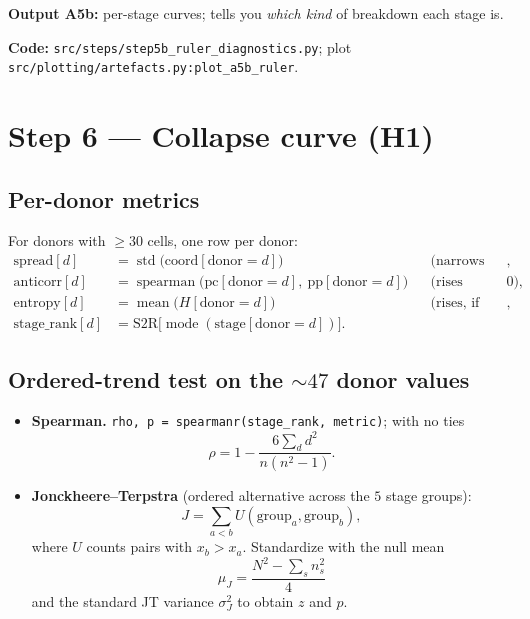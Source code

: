 \documentclass[11pt]{article}
\newcommand{\code}[1]{\texttt{\small #1}}
\newcommand{\coordc}{\mathrm{coord}}
\begin{document}
\textbf{Output A5b:} per-stage curves; tells you \emph{which kind} of breakdown each stage is.

\medskip
\noindent\textbf{Code:} \code{src/steps/step5b\_ruler\_diagnostics.py};
plot \code{src/plotting/artefacts.py:plot\_a5b\_ruler}.

\section{Step 6 --- Collapse curve (H1)}

\subsection{Per-donor metrics}
For donors with $\ge 30$ cells, one row per donor:
\begin{align}
  \text{spread}[d]     &= \operatorname{std}\big(\coordc[\text{donor}=d]\big)
                          && \text{(narrows with disease)}, \\
  \text{anticorr}[d]   &= \operatorname{spearman}\big(\text{pc}[\text{donor}=d],\ \text{pp}[\text{donor}=d]\big)
                          && \text{(rises toward } 0), \\
  \text{entropy}[d]    &= \operatorname{mean}\big(H[\text{donor}=d]\big)
                          && \text{(rises, if classifier run)}, \\
  \text{stage\_rank}[d] &= \text{S2R}\big[\operatorname{mode}(\text{stage}[\text{donor}=d])\big].
\end{align}

\subsection{Ordered-trend test on the $\sim\!47$ donor values}
\begin{itemize}[leftmargin=1.4em]
  \item \textbf{Spearman.} \code{rho, p = spearmanr(stage\_rank, metric)}; with no ties
        \[
          \rho = 1 - \frac{6\sum_d d^2}{n(n^2-1)}.
        \]
  \item \textbf{Jonckheere--Terpstra} (ordered alternative across the $5$ stage groups):
        \[
          J = \sum_{a<b} U(\text{group}_a, \text{group}_b),
        \]
        where $U$ counts pairs with $x_b > x_a$. Standardize with the null mean
        \[
          \mu_J = \frac{N^2 - \sum_s n_s^2}{4}
        \]
        and the standard JT variance $\sigma_J^2$ to obtain $z$ and $p$.
\end{itemize}
\end{document}

